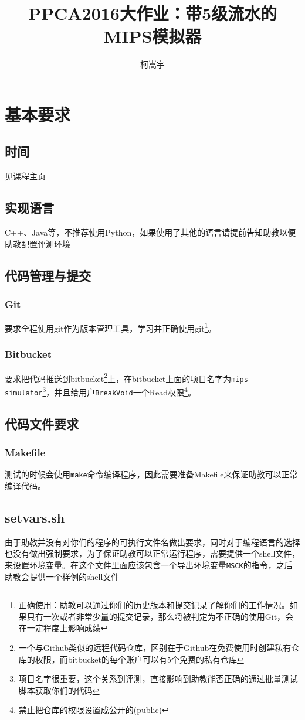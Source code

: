 \documentclass[a4paper, 11pt]{article}
\title{PPCA2016大作业：带5级流水的MIPS模拟器}
\author{柯嵩宇}
\begin{document}
\maketitle
\tableofcontents

\newpage
\section{基本要求}
\subsection{时间}
	见课程主页
\subsection{实现语言}
	C++、Java等，不推荐使用Python，如果使用了其他的语言请提前告知助教以便助教配置评测环境
\subsection{代码管理与提交}
\subsubsection{Git}
	要求全程使用git作为版本管理工具，学习并正确使用git\footnote{正确使用：助教可以通过你们的历史版本和提交记录了解你们的工作情况。如果只有一次或者非常少量的提交记录，那么将被判定为不正确的使用Git，会在一定程度上影响成绩}。
\subsubsection{Bitbucket}
	要求把代码推送到bitbucket\footnote{一个与Github类似的远程代码仓库，区别在于Github在免费使用时创建私有仓库的权限，而bitbucket的每个账户可以有5个免费的私有仓库}上，在bitbucket上面的项目名字为\texttt{mips-simulator}\footnote{项目名字很重要，这个关系到评测，直接影响到助教能否正确的通过批量测试脚本获取你们的代码}，并且给用户\texttt{BreakVoid}一个Read权限\footnote{禁止把仓库的权限设置成公开的(public)}。
\subsection{代码文件要求}
\subsubsection{Makefile}
	测试的时候会使用\texttt{make}命令编译程序，因此需要准备Makefile来保证助教可以正常编译代码。
\subsection{setvars.sh}
	由于助教并没有对你们的程序的可执行文件名做出要求，同时对于编程语言的选择也没有做出强制要求，为了保证助教可以正常运行程序，需要提供一个shell文件，来设置环境变量。在这个文件里面应该包含一个导出环境变量\texttt{MSCK}的指令，之后助教会提供一个样例的shell文件
\end{document}
